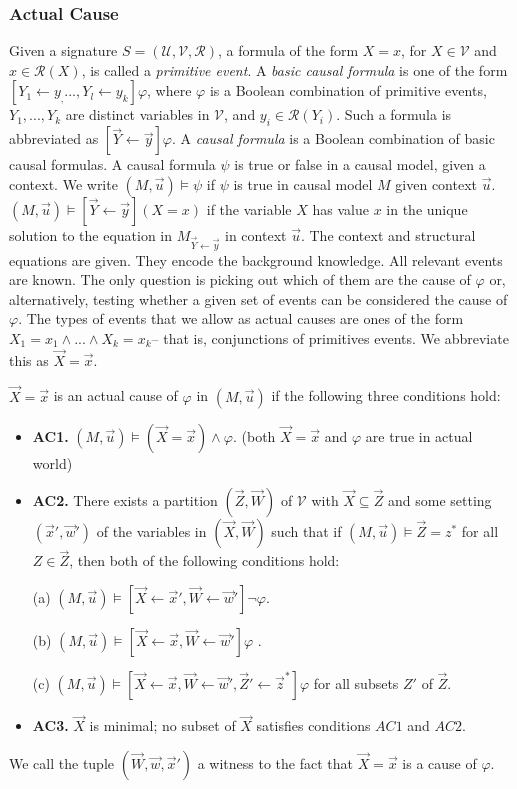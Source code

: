 \subsubsection{Actual Cause}
Given a signature $S= (\mathcal{U},\mathcal{V},\mathcal{R})$, a formula of the form $X =x$, for $X \in \mathcal{V}$ and $x \in \mathcal{R}(X)$, is called a \textit{primitive event}.
A \textit{basic causal formula} is one of the form $[Y_1 \leftarrow y_, ..., Y_l\leftarrow y_k]\varphi$, where $\varphi$ is a Boolean combination of primitive events, $Y_1,...,Y_k$ are distinct variables in $\mathcal{V}$, and $y_i \in \mathcal{R}(Y_i)$.
Such a formula is abbreviated as $[\vec{Y}\leftarrow\vec{y}]\varphi$.
A \textit{causal formula} is a Boolean combination of basic causal formulas.
A causal formula $\psi$ is true or false in a causal model, given a context.
We write $(M,\vec u)\models \psi$ if $\psi$ is true in causal model $M$ given context $\vec u$.
$(M,\vec u)\models [\vec Y\leftarrow \vec y](X=x)$ if the variable $X$ has value $x$ in the unique solution to the equation in $M_{\vec{Y} \leftarrow \vec{y}}$ in context $\vec u$.
The context and structural equations are given.
They encode the background knowledge.
All relevant events are known.
The only question is picking out which of them are the cause of $\varphi$ or, alternatively, testing whether a given set of events can be considered the cause of $\varphi$.
The types of events that we allow as actual causes are ones of the form $X_1 = x_1 \wedge ... \wedge X_k=x_k$-- that is, conjunctions of primitives events.
We abbreviate this as $\vec X = \vec x$.
\begin{definition}
    $\vec X = \vec x$ is an actual cause of $\varphi$ in $(M,\vec u)$ if the following three conditions hold:
    \begin{itemize}
        \item  \textbf{AC1.} $(M,\vec u)\models (\vec X = \vec x) \wedge \varphi$.
              (both $\vec X = \vec x$ and $\varphi$ are true in actual world)
        \item  \textbf{AC2. }There exists a partition $(\vec Z, \vec W)$ of $\mathcal{V}$ with $\vec X \subseteq \vec Z$ and some setting $(\vec x',\vec w')$ of the variables in $(\vec X,\vec W)$ such that if $(M,\vec u)\models \vec Z = z^*$ for all $Z\in \vec Z$, then both of the following conditions hold:

              (a) $(M,\vec u)\models[\vec X \leftarrow \vec x', \vec W \leftarrow \vec w']\neg \varphi$.

              (b) $(M,\vec u)\models[\vec X\leftarrow \vec x, \vec W \leftarrow \vec w']\varphi$ .

              (c) $(M,\vec u)\models[\vec X\leftarrow \vec x, \vec W \leftarrow \vec w', \vec Z'\leftarrow \vec z^*]\varphi$ for all subsets $Z'$ of $\vec Z$.

        \item  \textbf{AC3.} $\vec X$ is minimal; no subset of $\vec X$ satisfies conditions $AC1$ and $AC2$.
    \end{itemize}
\end{definition}
We call the tuple $(\vec W, \vec w,\vec x')$ a witness to the fact that $\vec X=\vec x$ is a cause of $\varphi$.


